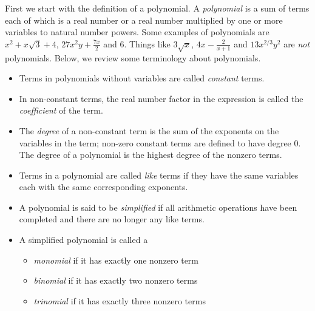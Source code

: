 First we start with the definition of a polynomial. A \emph{polynomial} is a sum of terms each of which is a real number or a real number multiplied by one or more variables to natural number powers. Some examples of polynomials are $x^2 + x\sqrt{3} + 4$, $27x^2y + \frac{7x}{2}$ and $6$. Things like $3\sqrt{x}$, $4x - \frac{2}{x+1}$ and $13x^{2/3}y^{2}$ are \emph{not} polynomials. Below, we review some terminology about polynomials.
\begin{definition}
\begin{itemize}

\item  Terms in polynomials without variables are called \emph{constant} terms.

\item  In non-constant terms, the real number factor in the expression is called the \emph{coefficient} of the term. 

\item  The \emph{degree} of a non-constant term is the sum of the exponents on the variables in the term; non-zero constant terms are defined to have degree $0$. The degree of a polynomial is the highest degree of the nonzero terms.

\item  Terms in a polynomial are called \emph{like} terms if they have the same variables each with the same corresponding exponents.

\item  A polynomial is said to be \emph{simplified} if all arithmetic operations have been completed and there are no longer any like terms.

\item  A simplified polynomial  is  called a 

\begin{itemize}

\item   \emph{monomial} if it has exactly one nonzero term

\item   \emph{binomial} if it has exactly two nonzero terms

\item   \emph{trinomial} if it has exactly three nonzero terms

\end{itemize}

\end{itemize}
\end{definition}

